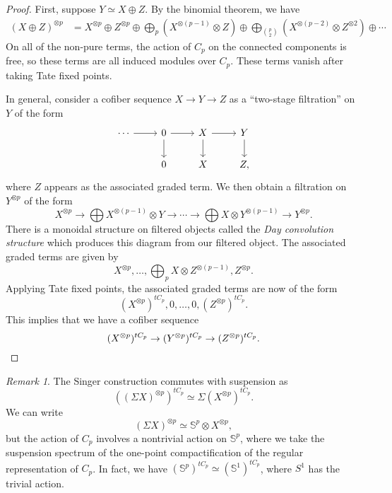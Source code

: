 \documentclass[10pt]{amsart}
\theoremstyle{definition}
\theoremstyle{remark}
\newtheorem{rmk}[thm]{Remark}
\theoremstyle{plain}
\theoremstyle{definition}
\theoremstyle{remark}
\newcommand{\bS}{\mathbb{S}}
\newcommand{\1}{\mathbf{1}}
\newcommand{\2}{\mathbf{2}}
\newcommand{\3}{\mathbf{3}}
\begin{document}
\begin{proof}
    First, suppose $Y \simeq X \oplus Z$. By the binomial theorem, we have
    \begin{align*}
        (X \oplus Z)^{\otimes p} &= X^{\otimes p} \oplus Z^{\otimes p} \oplus \bigoplus_p (X^{\otimes (p-1)} \otimes Z) \oplus \bigoplus_{\binom{p}{2}} (X^{\otimes (p-2)} \otimes Z^{\otimes 2})\oplus \cdots
    \end{align*}
    On all of the non-pure terms, the action of $C_p$ on the connected components is free, so these terms are all induced modules over $C_p$. These terms vanish after taking Tate fixed points.

    In general, consider a cofiber sequence $X \to Y \to Z$ as a ``two-stage filtration'' on $Y$ of the form
    \begin{equation*}
    \begin{tikzcd}
        \cdots \ar{r} & 0 \ar{r} \ar{d} & X \ar{r} \ar{d} & Y \ar{d} \\
        &  0 & X & Z,
    \end{tikzcd}
    \end{equation*}
    where $Z$ appears as the associated graded term. We then obtain a filtration on $Y^{\otimes p}$ of the form
    \[ X^{\otimes p} \to \bigoplus X^{\otimes (p-1)} \otimes Y \to \cdots \to \bigoplus X \otimes Y^{\otimes (p-1)} \to Y^{\otimes p}. \]
    There is a monoidal structure on filtered objects called the \textit{Day convolution structure} which produces this diagram from our filtered object. The associated graded terms are given by
    \[ X^{\otimes p}, \ldots, \bigoplus_p X \otimes Z^{\otimes (p-1)}, Z^{\otimes p}. \]
    Applying Tate fixed points, the associated graded terms are now of the form
    \[ (X^{\otimes p})^{tC_p}, 0, \ldots, 0, (Z^{\otimes p})^{t C_p}. \]
    This implies that we have a cofiber sequence
    \[ (X^{\otimes p})^{t C_p} \to (Y^{\otimes p})^{t C_p} \to (Z^{\otimes p})^{t C_p}. \qedhere \]
\end{proof}

\begin{rmk}
    The Singer construction commutes with suspension as
    \[ ((\Sigma X)^{\otimes p})^{t C_p} \simeq \Sigma (X^{\otimes p})^{t C_p}. \]
    We can write
    \[ (\Sigma X)^{\otimes p} \simeq \bS^p \otimes X^{\otimes p}, \]
    but the action of $C_p$ involves a nontrivial action on $\bS^p$, where we take the suspension spectrum of the one-point compactification of the regular representation of $C_p$. In fact, we have $(\bS^p)^{t C_p} \simeq (\bS^1)^{t C_p}$, where $S^1$ has the trivial action.
\end{rmk}
\end{document}
